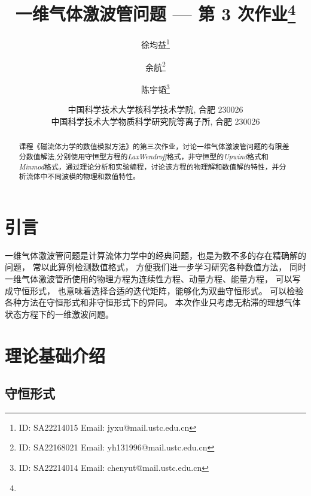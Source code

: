 \documentclass[10.5pt
]{article}
\title{一维气体激波管问题 --- 第 3 次作业\footnote{\Term\Course}}
\author{徐均益\footnote{ID: SA22214015 Email: jyxu@mail.ustc.edu.cn}
  \and
  余航\footnote{ID: SA22168021 Email: yh131996@mail.ustc.edu.cn}
  \and
  陈宇韬\footnote{ID: SA22214014 Email: chenyut@mail.ustc.edu.cn}
}
\date{%
\scriptsize%
中国科学技术大学核科学技术学院, 合肥 230026 \\
中国科学技术大学物质科学研究院等离子所, 合肥 230026
%
}
\begin{document}
\maketitle

\begin{abstract}
课程《磁流体力学的数值模拟方法》的第三次作业，讨论一维气体激波管问题的有限差分数值解法,分别使用守恒型方程的\textit{LaxWendroff}格式，非守恒型的\textit{Upwind}格式和\textit{Minmod}格式，通过理论分析和实验编程，讨论该方程的物理解和数值解的特性，并分析流体中不同波模的物理和数值特性。 

\end{abstract}

\section{引言}
一维气体激波管问题是计算流体力学中的经典问题，也是为数不多的存在精确解的问题，
常以此算例检测数值格式，
方便我们进一步学习研究各种数值方法，
同时一维气体激波管所使用的物理方程为连续性方程、动量方程、能量方程，
可以写成守恒形式，
也意味着选择合适的迭代矩阵，能够化为双曲守恒形式。
可以检验各种方法在守恒形式和非守恒形式下的异同。
本次作业只考虑无粘滞的理想气体状态方程下的一维激波问题。

\section{理论基础介绍}
\subsection{守恒形式}
\end{document}
